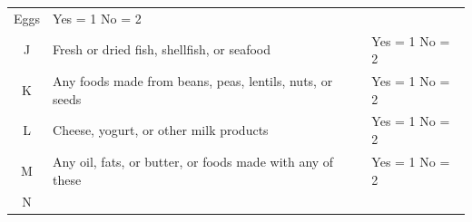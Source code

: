 \documentclass[12pt,]{book}
\theoremstyle{definition}
\theoremstyle{definition}
\theoremstyle{definition}
\theoremstyle{remark}
\begin{document}
\begin{longtable}[]{@{}cll@{}}
\begin{minipage}[t]{0.68\columnwidth}
Eggs\strut
\end{minipage} & \begin{minipage}[t]{0.18\columnwidth}\raggedright
Yes = 1 No = 2\strut
\end{minipage}\tabularnewline
\begin{minipage}[t]{0.06\columnwidth}\centering
J\strut
\end{minipage} & \begin{minipage}[t]{0.68\columnwidth}\raggedright
Fresh or dried fish, shellfish, or seafood\strut
\end{minipage} & \begin{minipage}[t]{0.18\columnwidth}\raggedright
Yes = 1 No = 2\strut
\end{minipage}\tabularnewline
\begin{minipage}[t]{0.06\columnwidth}\centering
K\strut
\end{minipage} & \begin{minipage}[t]{0.68\columnwidth}\raggedright
Any foods made from beans, peas, lentils, nuts, or seeds\strut
\end{minipage} & \begin{minipage}[t]{0.18\columnwidth}\raggedright
Yes = 1 No = 2\strut
\end{minipage}\tabularnewline
\begin{minipage}[t]{0.06\columnwidth}\centering
L\strut
\end{minipage} & \begin{minipage}[t]{0.68\columnwidth}\raggedright
Cheese, yogurt, or other milk products\strut
\end{minipage} & \begin{minipage}[t]{0.18\columnwidth}\raggedright
Yes = 1 No = 2\strut
\end{minipage}\tabularnewline
\begin{minipage}[t]{0.06\columnwidth}\centering
M\strut
\end{minipage} & \begin{minipage}[t]{0.68\columnwidth}\raggedright
Any oil, fats, or butter, or foods made with any of these\strut
\end{minipage} & \begin{minipage}[t]{0.18\columnwidth}\raggedright
Yes = 1 No = 2\strut
\end{minipage}\tabularnewline
\begin{minipage}[t]{0.06\columnwidth}\centering
N\strut
\end{minipage} & \begin{minipage}[t]{0.68\columnwidth}\raggedright

\end{minipage}
\end{longtable}
\end{document}
